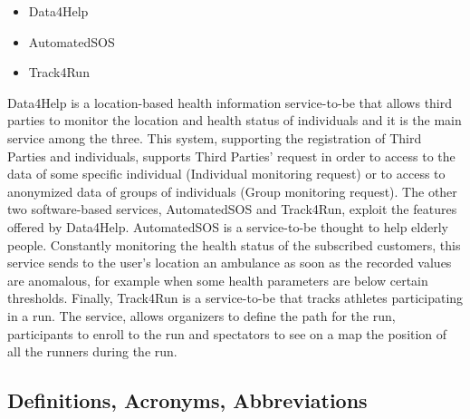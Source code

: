 \begin{itemize}[noitemsep,nolistsep]
\item Data4Help
\item AutomatedSOS
\item Track4Run
\end{itemize}
\bigbreak
\noindent
Data4Help is a location-based health information service-to-be that allows third parties to monitor the location and health status of individuals and it is the main service among the three. This system, supporting the registration of Third Parties and individuals, supports Third Parties' request in order to access to the data of some specific individual (Individual monitoring request) or to access to anonymized data of groups of individuals (Group monitoring request). The other two software-based services, AutomatedSOS and Track4Run, exploit the features offered by Data4Help.
\bigbreak
\noindent
AutomatedSOS is a service-to-be thought to help elderly people. Constantly monitoring the health status of the subscribed customers, this service sends to the user’s location an ambulance as soon as the recorded values are anomalous, for example when some health parameters are below certain thresholds.
\bigbreak
\noindent
Finally, Track4Run is a service-to-be that tracks athletes participating in a run. The service, allows organizers to define the path for the run, participants to enroll to the run and spectators to see on a map the position of all the runners during the run.
\subsection{Definitions, Acronyms, Abbreviations}


